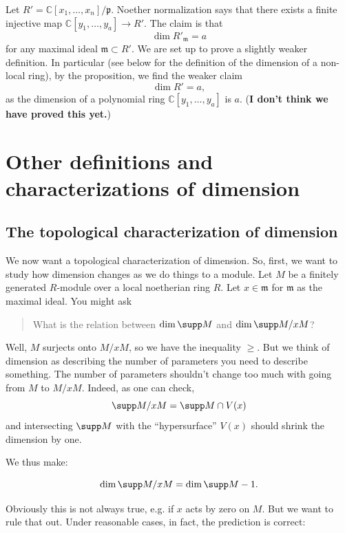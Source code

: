 \begin{example} 
Let $R' = \mathbb{C}[x_1, \dots, x_n]/\mathfrak{p}$. Noether normalization says
that there exists a finite injective map $\mathbb{C}[y_1, \dots, y_a] \to R'$.
The claim is that
\[ \dim R'_{\mathfrak{m}} =a  \]
for any maximal ideal $\mathfrak{m} \subset R'$. We are set up to prove a
slightly weaker definition. In particular (see below for the definition of the
dimension of a non-local ring), by the proposition, we
find the weaker claim
\[ \dim R' = a,  \]
as the dimension of a polynomial ring $\mathbb{C}[y_1, \dots, y_a]$ is $a$.
(\textbf{I don't think we have proved this yet.})
\end{example} 



\section{Other definitions and characterizations of dimension}

\subsection{The topological characterization of dimension} We now want a topological
characterization of dimension. So, first, we want to study how dimension
changes as we do things to a module. Let $M$ be a finitely generated $R$-module over a local
noetherian ring $R$. Let $x \in \mathfrak{m}$ for $\mathfrak{m}$ as the maximal
ideal.
You might ask
\begin{quote}
What is the relation between $\dim \supp M$ and $\dim \supp M/xM$?
\end{quote}
Well, $M$ surjects onto $M/xM$, so we have the inequality $\geq$. But we think
of dimension as describing the number of parameters you need to describe
something. The number of parameters shouldn't change too much with going from
$M$ to $M/xM$. Indeed, as one can check,
\[ \supp M/xM = \supp M \cap V(x)  \]
and intersecting $\supp M$ with the ``hypersurface'' $V(x)$ should shrink the
dimension by one. 


We thus make:
\begin{prediction}
\[ \dim \supp M/xM = \dim \supp M - 1.  \]
\end{prediction}
Obviously this is not always true, e.g. if $x$ acts by zero on $M$. But we want
to rule that out. 
Under reasonable cases, in fact, the prediction is correct:

